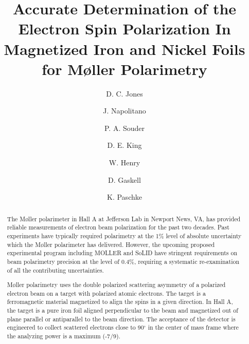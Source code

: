 \documentclass[preprint,12pt]{elsarticle}
\begin{document}
\linenumbers
\begin{frontmatter}


\title{Accurate Determination of the Electron Spin Polarization In Magnetized Iron and Nickel Foils for M\o ller  Polarimetry }


\author[a]{D. C. Jones}
\author[a]{J. Napolitano}
\address[a]{Temple University, Philadelphia, PA, 19122}
\author[b]{P. A. Souder}
\author[a,c]{D. E. King}
\address[b]{Syracuse University, Syracuse, NY 13244}
\author[c]{W. Henry}
\author[c]{D. Gaskell}
\address[c]{Jefferson Lab, Newport News, VA 23606}
\author[d]{K. Paschke}
\address[d]{University of Virginia, Charlottesville, VA 22903}


\begin{abstract}
The M\o ller polarimeter in Hall A at Jefferson Lab in Newport News, VA, has provided reliable measurements of electron beam polarization for the past two decades. Past experiments have typically required polarimetry at the 1\% level of absolute uncertainty which the M\o ller polarimeter has delivered. However, the upcoming proposed experimental program including MOLLER and SoLID have stringent requirements on beam polarimetry precision at the level of 0.4\%\cite{MOLLER2014, SoLID2019}, requiring a systematic re-examination of all the contributing uncertainties. 

M\o ller polarimetry uses the double polarized scattering asymmetry of a polarized electron beam on a target with polarized atomic electrons. The target is a ferromagnetic material magnetized to align the spins in a given direction. In Hall A, the target is a pure iron foil aligned perpendicular to the beam and magnetized out of plane parallel or antiparallel to the beam direction. The acceptance of the detector is engineered to collect scattered electrons close to 90$^{\circ}$ in the center of mass frame where the analyzing power is a maximum (-7/9).  


\end{abstract}
\end{frontmatter}
\end{document}

